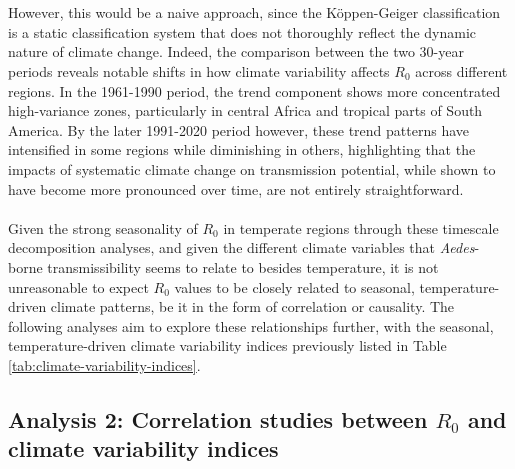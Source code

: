 \documentclass[10pt,twocolumn]{wlscirep}
\begin{document}
\\
\\
However, this would be a naive approach, since the Köppen-Geiger classification is a static classification system that does not thoroughly reflect the dynamic nature of climate change\cite{triantafyllou_1994}. Indeed, the comparison between the two 30-year periods reveals notable shifts in how climate variability affects $R_0$ across different regions. In the 1961-1990 period, the trend component shows more concentrated high-variance zones, particularly in central Africa and tropical parts of South America. By the later 1991-2020 period however, these trend patterns have intensified in some regions while diminishing in others, highlighting that the impacts of systematic climate change on transmission potential, while shown to have become more pronounced over time, are not entirely straightforward.
\\
\\
Given the strong seasonality of $R_0$ in temperate regions through these timescale decomposition analyses, and given the different climate variables that \textit{Aedes}-borne transmissibility seems to relate to besides temperature, it is not unreasonable to expect $R_0$ values to be closely related to seasonal, temperature-driven climate patterns, be it in the form of correlation or causality. The following analyses aim to explore these relationships further, with the seasonal, temperature-driven climate variability indices previously listed in Table \ref{tab:climate-variability-indices}.

\subsection{Analysis 2: Correlation studies between $R_0$ and climate variability indices} \label{sec-results-2}
\end{document}
